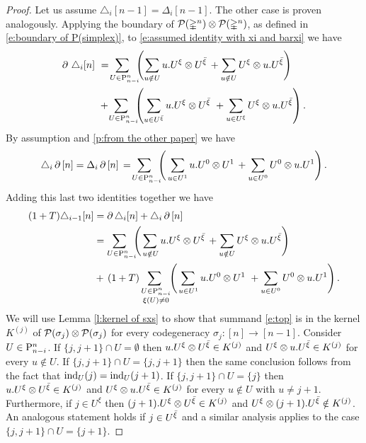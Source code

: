 \begin{proof}
	Let us assume $\triangle_i [n-1] = \Delta_i [n-1]$.
	The other case is proven analogously.
	Applying the boundary of $\cP(\simplex^n) \ot \cP(\simplex^n)$, as defined in \cref{e:boundary of P(simplex)}, to \cref{e:assumed identity with xi and barxi}	we have
	\begin{align*}
	\bd \, \triangle_i [n]\ & =\!
	\sum_{U \in \P_{n-i}^n \kern-5pt} \left(\sum_{u \notin U} {u.U^\xi} \ot {U^\barxi} \, +
	\sum_{u \notin U} {U^\xi} \ot {u.U^\barxi} \right) \\ & +\!
	\sum_{U \in \P_{n-i}^n \kern-5pt} \left(\sum_{u \in U^\barxi} {u.U^\xi} \ot {U^\barxi} \ +
	\sum_{u \in U^{\xi}} {U^\xi} \ot {u.U^\barxi} \right).
	\end{align*}
	By assumption and \cref{p:from the other paper} we have
	\[
	\triangle_i \bd \, [n] =
	\Delta_i \bd \, [n] \, = \!
	\sum_{U \in \P_{n-i}^n \kern-5pt} \left( \,
	\sum_{u \in U^1} {u.U^0} \ot {U^1} \, +
	\sum_{u \in U^0} {U^0} \ot {u.U^1} \right).
	\]
	Adding this last two identities together we have
	\begin{align}
	(1+T) \triangle_{i-1} [n] &= \bd \triangle_i [n] + \triangle_i \bd \, [n] \\ &=
	\label{e:top} \sum_{U \in \P_{n-i}^n \kern-5pt} \left(
	\sum_{\,u \notin U} u.U^\xi \ot U^\barxi \, +
	\sum_{u \notin U} U^\xi \ot u.U^\barxi \right) \\ &+ \,
	\label{e:bottom} (1+T) \sum_{\substack{U \in \P_{n-i}^n \\ \xi(U) \neq 0} \kern-3pt} \left(
	\sum_{\,u \in U^1} {u.U^0} \ot {U^1} \ +
	\sum_{u \in U^0} {U^0} \ot {u.U^1} \right).
	\end{align}
	We will use Lemma \ref{l:kernel of sxs} to show that summand \eqref{e:top} is in the kernel $K^{(j)}$ of $\cP(\sigma_j) \ot \cP(\sigma_j)$ for every codegeneracy $\sigma_j \colon [n] \to [n-1]$.
	Consider $U \in \P_{n-i}^n$.
	If $\{j, j+1\} \cap U = \emptyset$ then $u.U^\xi \ot U^\barxi \in K^{(j)}$ and $U^\xi \ot u.U^\barxi \in K^{(j)}$ for every $u \notin U$.
	If $\{j, j+1\} \cap U = \{j, j+1\}$ then the same conclusion follows from the fact that $\ind_U(j) = \ind_U(j+1)$.
	If $\{j, j+1\} \cap U = \{j\}$ then $u.U^\xi \ot U^\barxi \in K^{(j)}$ and $U^\xi \ot u.U^\barxi \in K^{(j)}$ for every $u \notin U$ with $u \neq j+1$.
	Furthermore, if $j \in U^\xi$ then $(j+1).U^\xi \ot U^\barxi \in K^{(j)}$ and $U^\xi \ot (j+1).U^\barxi \notin K^{(j)}$.
	An analogous statement holds if $j \in U^\barxi$ and a similar analysis applies to the case $\{j, j+1\} \cap U = \{j+1\}$.

\end{proof}
